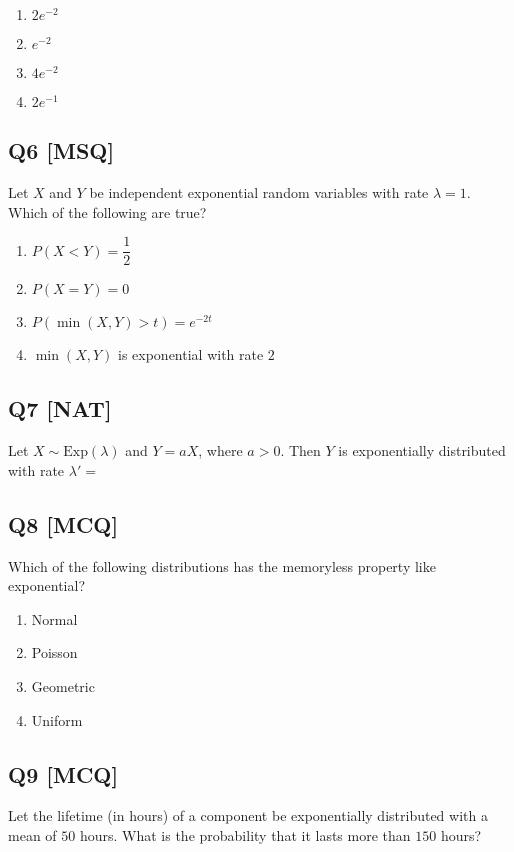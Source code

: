 \begin{enumerate}[label=(\alph*)]
\item $2e^{-2}$
\item $e^{-2}$
\item $4e^{-2}$
\item $2e^{-1}$
\end{enumerate}

\subsection*{Q6 [MSQ]}
Let $X$ and $Y$ be independent exponential random variables with rate $\lambda = 1$. Which of the following are true?

\begin{enumerate}[label=(\alph*)]
\item $P(X < Y) = \dfrac{1}{2}$
\item $P(X = Y) = 0$
\item $P(\min(X, Y) > t) = e^{-2t}$
\item $\min(X, Y)$ is exponential with rate $2$
\end{enumerate}

\subsection*{Q7 [NAT]}
Let $X \sim \text{Exp}(\lambda)$ and $Y = aX$, where $a > 0$. Then $Y$ is exponentially distributed with rate $\lambda' = $ \underline{\hspace{3cm}}

\subsection*{Q8 [MCQ]}
Which of the following distributions has the memoryless property like exponential?

\begin{enumerate}[label=(\alph*)]
\item Normal
\item Poisson
\item Geometric
\item Uniform
\end{enumerate}

\subsection*{Q9 [MCQ]}
Let the lifetime (in hours) of a component be exponentially distributed with a mean of $50$ hours. What is the probability that it lasts more than $150$ hours?

